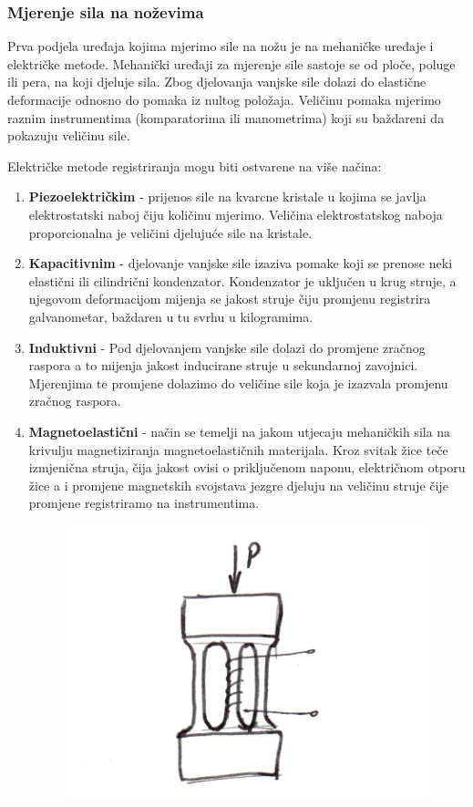 \documentclass[a4paper,12pt]{article}
\numberwithin{figure}{section}
\begin{document}
\subsubsection{Mjerenje sila na noževima}
Prva podjela uređaja kojima mjerimo sile na nožu je na mehaničke uređaje i električke metode. Mehanički uređaji za mjerenje sile sastoje se od ploče, poluge ili pera, na koji djeluje sila. Zbog djelovanja vanjske sile dolazi do elastične deformacije odnosno do pomaka iz nultog položaja. Veličinu pomaka mjerimo raznim instrumentima (komparatorima ili manometrima) koji su baždareni da pokazuju veličinu sile.\par
Električke metode registriranja mogu biti ostvarene na više načina:
\begin{enumerate}
\item \textbf{Piezoelektričkim} - prijenos sile na kvarcne kristale u kojima se javlja elektrostatski naboj čiju količinu mjerimo. Veličina elektrostatskog naboja proporcionalna je veličini djelujuće sile na kristale.
\item \textbf{Kapacitivnim} - djelovanje vanjske sile izaziva pomake koji se prenose neki elastični ili cilindrični kondenzator. Kondenzator je uključen u krug struje, a njegovom deformacijom mijenja se jakost struje čiju promjenu registrira galvanometar, baždaren u tu svrhu u kilogramima.
\item \textbf{Induktivni} - Pod djelovanjem vanjske sile dolazi do promjene zračnog raspora a to mijenja jakost inducirane struje u sekundarnoj zavojnici. Mjerenjima te promjene dolazimo do veličine sile koja je izazvala promjenu zračnog raspora.
\item \textbf{Magnetoelastični} - način se temelji na jakom utjecaju mehaničkih sila na krivulju magnetiziranja magnetoelastičnih materijala. Kroz svitak žice teče izmjenična struja, čija jakost ovisi o priključenom naponu, električnom otporu žice a i promjene magnetskih svojstava jezgre djeluju na veličinu struje čije promjene registriramo na instrumentima.
\begin{figure}[!h]
\includegraphics[scale=0.2]{image_10-1.png}

\end{figure}
\end{enumerate}
\end{document}
